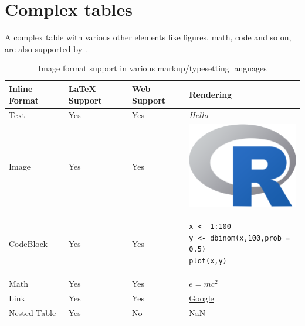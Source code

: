 \section{Complex tables}
A complex table with various other elements like figures, math, code and so on, are also supported
by .  
\begin{table}[htbp]
\centering
\begin{tabular}{|l | lll |}
 \hline
 Inline Format & LaTeX Support & Web Support &  Rendering \\
 \hline
 Text       & Yes & Yes  & \emph{Hello} \\ \hline
 Image       & Yes & Yes & \begin{minipage}{0.25\textwidth}
    \centering
    \includegraphics[width=1\textwidth]{Rlogo-5.png}
    \end{minipage} \\ \hline
 CodeBlock      & Yes & Yes & \begin{minipage}{0.45\textwidth}
\vspace{1mm}
\begin{verbatim}
x <- 1:100
y <- dbinom(x,100,prob = 0.5)
plot(x,y)
\end{verbatim}
    \end{minipage} \\ \hline
 Math      & Yes & Yes & $e = m c^2 $ \\ \hline
 Link      & Yes & Yes &  \href{www.google.com}{Google} \\ \hline
 Nested Table & Yes & No & NaN \\
\hline
\end{tabular}
\caption{Image format support in various markup/typesetting languages}
\label{table:3}
\end{table}

